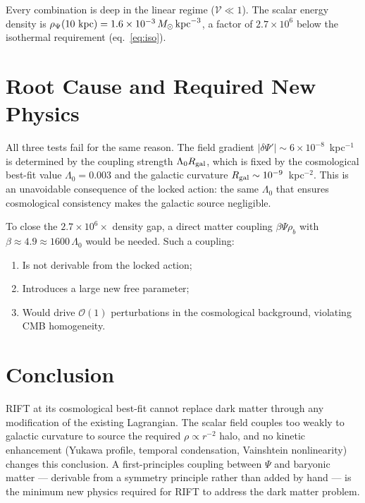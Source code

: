 \documentclass[12pt,a4paper]{article}
\begin{document}
Every combination is deep in the linear regime ($\mathcal{V}\ll1$).
The scalar energy density is
$\rho_\Psi(10~{\rm kpc}) = 1.6\times10^{-3}\,M_\odot\,{\rm kpc}^{-3}$,
a factor of $2.7\times10^6$ below the isothermal requirement
(eq.~\ref{eq:iso}).

\section{Root Cause and Required New Physics}

All three tests fail for the same reason.
The field gradient $|\delta\Psi'|\sim6\times10^{-8}$~kpc$^{-1}$ is
determined by the coupling strength $\Lambda_0 R_{\rm gal}$, which
is fixed by the cosmological best-fit value $\Lambda_0=0.003$ and the
galactic curvature $R_{\rm gal}\sim10^{-9}$~kpc$^{-2}$.
This is an unavoidable consequence of the locked action: the same
$\Lambda_0$ that ensures cosmological consistency makes the galactic
source negligible.

To close the $2.7\times10^6\times$ density gap, a direct matter coupling
$\beta\Psi\rho_b$ with $\beta\approx4.9\approx1600\,\Lambda_0$ would be
needed.  Such a coupling:
\begin{enumerate}
\item Is not derivable from the locked action;
\item Introduces a large new free parameter;
\item Would drive $\mathcal{O}(1)$ perturbations in the cosmological
      background, violating CMB homogeneity.
\end{enumerate}

\section{Conclusion}

RIFT at its cosmological best-fit cannot replace dark matter through any
modification of the existing Lagrangian.
The scalar field couples too weakly to galactic curvature to source
the required $\rho\propto r^{-2}$ halo, and no kinetic enhancement
(Yukawa profile, temporal condensation, Vainshtein nonlinearity) changes
this conclusion.
A first-principles coupling between $\Psi$ and baryonic matter ---
derivable from a symmetry principle rather than added by hand --- is
the minimum new physics required for RIFT to address the dark matter problem.
\end{document}
